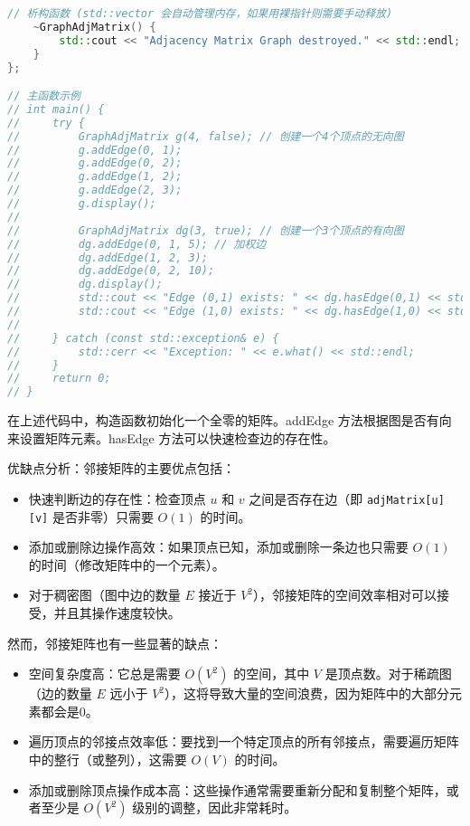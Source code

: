 \begin{lstlisting}[language=cpp]
    // 析构函数 (std::vector 会自动管理内存，如果用裸指针则需要手动释放)
    ~GraphAdjMatrix() {
        std::cout << "Adjacency Matrix Graph destroyed." << std::endl;
    }
};

// 主函数示例
// int main() {
//     try {
//         GraphAdjMatrix g(4, false); // 创建一个4个顶点的无向图
//         g.addEdge(0, 1);
//         g.addEdge(0, 2);
//         g.addEdge(1, 2);
//         g.addEdge(2, 3);
//         g.display();
// 
//         GraphAdjMatrix dg(3, true); // 创建一个3个顶点的有向图
//         dg.addEdge(0, 1, 5); // 加权边
//         dg.addEdge(1, 2, 3);
//         dg.addEdge(0, 2, 10);
//         dg.display();
//         std::cout << "Edge (0,1) exists: " << dg.hasEdge(0,1) << std::endl;
//         std::cout << "Edge (1,0) exists: " << dg.hasEdge(1,0) << std::endl;
// 
//     } catch (const std::exception& e) {
//         std::cerr << "Exception: " << e.what() << std::endl;
//     }
//     return 0;
// }
\end{lstlisting}
在上述代码中，构造函数初始化一个全零的矩阵。addEdge 方法根据图是否有向来设置矩阵元素。hasEdge 方法可以快速检查边的存在性。

优缺点分析：邻接矩阵的主要优点包括：

\begin{itemize}
	\item 快速判断边的存在性：检查顶点 $u$ 和 $v$ 之间是否存在边（即 \lstinline{adjMatrix[u][v]} 是否非零）只需要 $O(1)$ 的时间。
	\item 添加或删除边操作高效：如果顶点已知，添加或删除一条边也只需要 $O(1)$ 的时间（修改矩阵中的一个元素）。
	\item 对于稠密图（图中边的数量 $E$ 接近于 $V^2$），邻接矩阵的空间效率相对可以接受，并且其操作速度较快。
\end{itemize}

然而，邻接矩阵也有一些显著的缺点：

\begin{itemize}
	\item 空间复杂度高：它总是需要 $O(V^2)$ 的空间，其中 $V$ 是顶点数。对于稀疏图（边的数量 $E$ 远小于 $V^2$），这将导致大量的空间浪费，因为矩阵中的大部分元素都会是0。
	\item 遍历顶点的邻接点效率低：要找到一个特定顶点的所有邻接点，需要遍历矩阵中的整行（或整列），这需要 $O(V)$ 的时间。
	\item 添加或删除顶点操作成本高：这些操作通常需要重新分配和复制整个矩阵，或者至少是 $O(V^2)$ 级别的调整，因此非常耗时。
\end{itemize}

